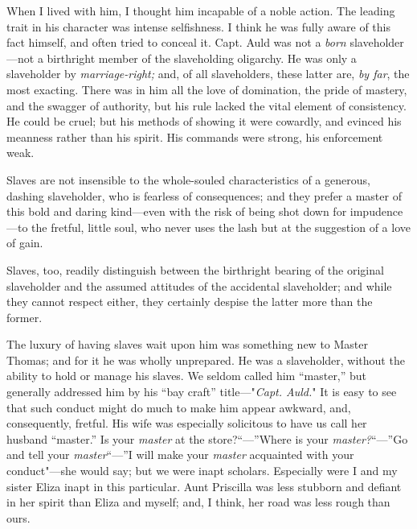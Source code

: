 When I lived with him, I thought him incapable of a noble action. The
leading trait in his character was intense selfishness. I think he was
fully aware of this fact himself, and often tried to conceal it. Capt.
Auld was not a \emph{born} slaveholder---not a birthright member of the
slaveholding oligarchy. He was only a slaveholder by
\emph{marriage-right;} and, of all slaveholders, these latter are,
\emph{by far}, the most exacting. There was in him all the love of
domination, the pride of mastery, and the swagger of
{\protect\hypertarget{192}{}{}}authority, but his rule lacked the vital
element of consistency. He could be cruel; but his methods of showing it
were cowardly, and evinced his meanness rather than his spirit. His
commands were strong, his enforcement weak.

Slaves are not insensible to the whole-souled characteristics of a
generous, dashing slaveholder, who is fearless of consequences; and they
prefer a master of this bold and daring kind---even with the risk of
being shot down for impudence---to the fretful, little soul, who never
uses the lash but at the suggestion of a love of gain.

Slaves, too, readily distinguish between the birthright bearing of the
original slaveholder and the assumed attitudes of the accidental
slaveholder; and while they cannot respect either, they certainly
despise the latter more than the former.

The luxury of having slaves wait upon him was something new to Master
Thomas; and for it he was wholly unprepared. He was a slaveholder,
without the ability to hold or manage his slaves. We seldom called him
``master,'' but generally addressed him by his ``bay craft''
title---"\emph{Capt. Auld.}" It is easy to see that such conduct might
do much to make him appear awkward, and, consequently, fretful. His wife
was especially solicitous to have us call her husband ``master.'' Is
your \emph{master} at the store?``---''Where is your
\emph{master?}``---''Go and tell your \emph{master}``---''I will make
your \emph{master} acquainted with your conduct"---she would say; but we
were inapt scholars. Especially were I and my sister Eliza inapt in this
particular. Aunt Priscilla was less
{\protect\hypertarget{193}{}{}}stubborn and defiant in her spirit than
Eliza and myself; and, I think, her road was less rough than ours.


